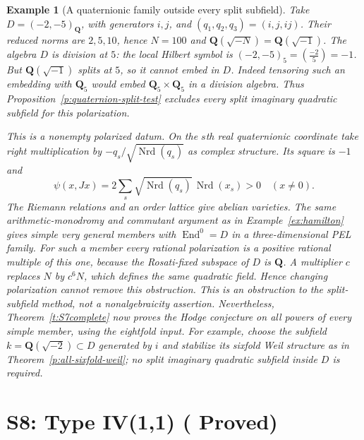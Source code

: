 \documentclass[11pt,reqno]{article}
\theoremstyle{emphasizedplain}
\DeclareRobustCommand{\provedstatus}{%
  \texorpdfstring{\textcolor{ProvedGreen}{\textbf{Proved}}}{Proved}}
\theoremstyle{emphasizeddefinition}
\newtheorem{example}[theorem]{Example}
\theoremstyle{emphasizeddefinition}
\DeclareMathOperator{\End}{End}
\newcommand{\Q}{\mathbf Q}
\begin{document}
\begin{example}[A quaternionic family outside every split subfield]
\label{ex:quaternion-nonsplit}
Take $D=(-2,-5)_\Q$, with generators $i,j$, and
$(q_1,q_2,q_3)=(i,j,ij)$. Their reduced norms are $2,5,10$, hence
$N=100$ and $\Q(\sqrt{-N})=\Q(\sqrt{-1})$.
The algebra $D$ is division at $5$: the local Hilbert symbol is
$(-2,-5)_5=(\frac{-2}{5})=-1$. But $\Q(\sqrt{-1})$ splits at $5$,
so it cannot embed in $D$. Indeed tensoring such an embedding with
$\Q_5$ would embed $\Q_5\times\Q_5$ in a division algebra.
Thus Proposition~\ref{p:quaternion-split-test} excludes every split
imaginary quadratic subfield for this polarization.

This is a nonempty polarized datum. On the $s$th real quaternionic
coordinate take right multiplication by
$-q_s/\sqrt{\operatorname{Nrd}(q_s)}$ as complex structure. Its square
is $-1$ and
\[
 \psi(x,Jx)=2\sum_s\sqrt{\operatorname{Nrd}(q_s)}\,
                  \operatorname{Nrd}(x_s)>0\quad(x\ne0).
\]
The Riemann relations and an order lattice give abelian varieties.
The same arithmetic-monodromy and commutant argument as in
Example~\ref{ex:hamilton} gives simple very general members with
$\End^0=D$ in a three-dimensional PEL family.
For such a member every rational polarization is a positive rational
multiple of this one, because the Rosati-fixed subspace of $D$ is
$\Q$. A multiplier $c$ replaces $N$ by $c^6N$, which defines the
same quadratic field. Hence changing polarization cannot remove this
obstruction. This is an obstruction to the split-subfield method,
not a nonalgebraicity assertion. Nevertheless,
Theorem~\ref{t:S7complete} now proves the Hodge conjecture on all
powers of every simple member, using the eightfold input. For example,
choose the subfield $k=\Q(\sqrt{-2})\subset D$ generated by $i$ and stabilize its
sixfold Weil structure as in Theorem~\ref{p:all-sixfold-weil};
no split imaginary quadratic subfield inside $D$ is required.
\end{example}
\section{S8: Type IV(1,1) (\provedstatus)}\label{sec:S8}
\end{document}
